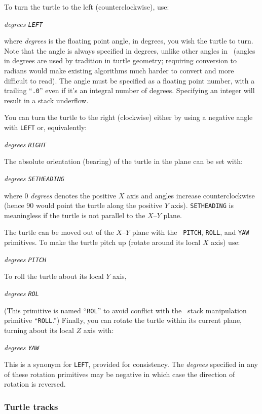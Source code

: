 \documentclass{article}
\begin{document}
To turn the turtle to the left (counterclockwise), use:

{\em degrees {\tt LEFT}}

where {\em degrees} is the floating point angle, in degrees, you wish
the turtle to turn.  Note that the angle is always specified in
degrees, unlike other angles in \atlas\ (angles in degrees are used by
tradition in turtle geometry; requiring conversion to radians would
make existing algorithms much harder to convert and more difficult to
read).  The angle must be specified as a floating point number, with a
trailing ``{\tt .0}'' even if it's an integral number of degrees.
Specifying an integer will result in a stack underflow.

You can turn the turtle to the right (clockwise) either by using a negative
angle with {\tt LEFT} or, equivalently:

{\em degrees {\tt RIGHT}}

The absolute orientation (bearing) of the turtle in the plane can be
set with:

{\em degrees {\tt SETHEADING}}

where 0 {\em degrees} denotes the positive $X$ axis and angles
increase counterclockwise (hence 90 would point the turtle along
the positive $Y$ axis).  {\tt SETHEADING} is meaningless if the turtle
is not parallel to the $X$--$Y$ plane.

The turtle can be moved out of the $X$--$Y$ plane with the {\tt
PITCH}, {\tt ROLL}, and {\tt YAW} primitives.  To make the turtle
pitch up (rotate around its local $X$ axis) use:

{\em degrees {\tt PITCH}}

To roll the turtle about its local $Y$ axis,

{\em degrees {\tt ROL}}

(This primitive is named ``{\tt ROL}'' to avoid conflict with the
\atlas\ stack manipulation primitive ``{\tt ROLL}\@.'')
Finally, you can rotate the turtle within its current plane,
turning about its local $Z$ axis with:

{\em degrees {\tt YAW}}

This is a synonym for {\tt LEFT}, provided for consistency.  The {\em
degrees} specified in any of these rotation primitives may be
negative in which case the direction of rotation is reversed.

\subsubsection{Turtle tracks}
\end{document}
